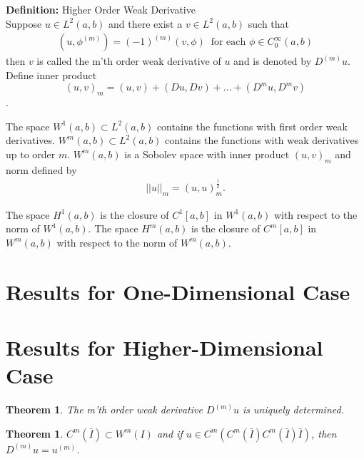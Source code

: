 \documentclass[../../main.tex]{subfiles}
\begin{document}
\textbf{Definition:} Higher Order Weak Derivative\\
Suppose $u \in L^2(a,b)$ and there exist a $v \in L^2(a,b)$ such that
\begin{eqnarray*}
	(u,\phi^{(m)}) = (-1)^{(m)}(v,\phi) \ \textrm{ for each } \phi \in C^{\infty}_0(a,b)
\end{eqnarray*}
then $v$ is called the m'th order weak derivative of $u$ and is denoted by $D^{(m)}u$.\\

Define inner product $$(u,v)_m = (u,v) + (Du,Dv) + ... + (D^mu ,D^mv)$$.

The space $W^1(a,b) \subset L^2(a,b)$ contains the functions with first order weak derivatives. $W^m(a,b)\subset L^2(a,b)$ contains the functions with weak derivatives up to order $m$. $W^m(a,b)$ is a Sobolev space with inner product $(u,v)_m$ and norm defined by 
\begin{eqnarray*}
	||u||_m = (u,u)^{\frac{1}{2}}_m.
\end{eqnarray*}

The space $H^1(a,b)$ is the closure of $C^1[a,b]$ in $W^1(a,b)$ with respect to the norm of $W^1(a,b)$. The space $H^m(a,b)$ is the closure of $C^m[a,b]$ in $W^m(a,b)$ with respect to the norm of $W^m(a,b)$.

\section*{Results for One-Dimensional Case}



\section*{Results for Higher-Dimensional Case}

\newtheorem{thmAH1}{Theorem}
\begin{thmAH1}
	The m'th order weak derivative $D^{(m)}u$ is uniquely determined.
\end{thmAH1}

\newtheorem{thmAH2}{Theorem}
\begin{thmAH2}
	$C^m(\bar{I}) \subset W^m(I)$ and if $u \in C^m(C^m(\bar{I})C^m(\bar{I})\bar{I})$, then $D^{(m)}u = u^{(m)}$. 
\end{thmAH2}
\end{document}
